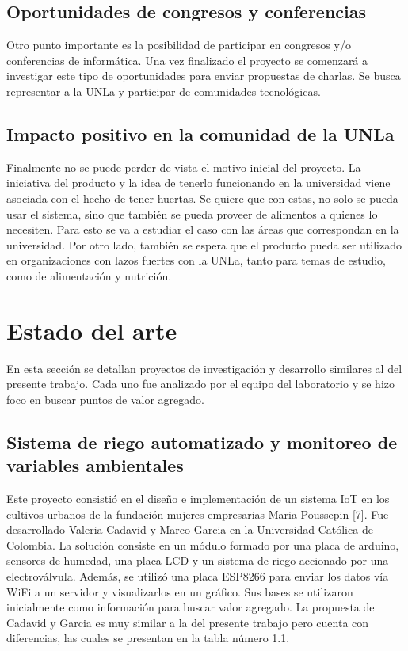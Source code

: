 \subsection{Oportunidades de congresos y conferencias}
Otro punto importante es la posibilidad de participar en congresos y/o conferencias de informática. Una vez finalizado el proyecto se comenzará a investigar este tipo de oportunidades para enviar propuestas de charlas. Se busca representar a la UNLa y participar de comunidades tecnológicas.

\subsection{Impacto positivo en la comunidad de la UNLa}
Finalmente no se puede perder de vista el motivo inicial del proyecto. La iniciativa del producto y la idea de tenerlo funcionando en la universidad viene asociada con el hecho de tener huertas. Se quiere que con estas, no solo se pueda usar el sistema, sino que también se pueda proveer de alimentos a quienes lo necesiten. Para esto se va a estudiar el caso con las áreas que correspondan en la universidad. Por otro lado, también se espera que el producto pueda ser utilizado en organizaciones con lazos fuertes con la UNLa, tanto para temas de estudio, como de alimentación y nutrición.


\section{Estado del arte}
En esta sección se detallan proyectos de investigación y desarrollo similares al del presente trabajo. Cada uno fue analizado por el equipo del laboratorio y se hizo foco en buscar puntos de valor agregado.\\

\subsection{Sistema de riego automatizado y monitoreo de variables ambientales}
Este proyecto consistió en el diseño e implementación de un sistema IoT en los cultivos urbanos de la fundación mujeres empresarias Maria Poussepin [7].
Fue desarrollado Valeria Cadavid y Marco Garcia en la Universidad Católica de Colombia.
La solución consiste en un módulo formado por una placa de arduino, sensores de humedad, una placa LCD y un sistema de riego accionado por una electroválvula. Además, se utilizó una placa ESP8266 para enviar los datos vía WiFi a un servidor y visualizarlos en un gráfico. Sus bases se utilizaron inicialmente como información para buscar valor agregado. La propuesta de Cadavid y Garcia es muy similar a la del presente trabajo pero cuenta con diferencias, las cuales se presentan en la tabla número 1.1.\\

